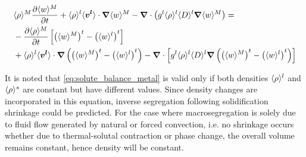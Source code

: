 %

\begin{align}
\label{eq:solute_balance_metal}
\begin{split}
 & \avg{\rho}^M \tempup{\avg{w}^M}  + \rhol  \vit \cdot \nabvec \avg{w}^M - \nabvec \cdot \brac{\gl \rhol \Dl \nabvec \avg{w}^M}=\\
 &	 - \tempup{\avg{\rho}^M} \crochet{\brac{\avg{w}^M}^t - \brac{\wl}^t} \\ 
 &	 + \rhol \vit \cdot \nabvec \brac{\brac{\avg{w}^M}^t -\brac{\wl}^t}
 	 - \nabvec \cdot \crochet{\gl \rhol \Dl  \nabvec \brac{\brac{\avg{w}^M}^t -\brac{\wl}^t} }
  \end{split}
  \end{align}

It is noted that \cref{eq:solute_balance_metal} is valid only if both densities $\langle \rho \rangle^l$ and $\langle \rho \rangle^s$
are constant but have different values. Since density changes are incorporated in this equation, 
inverse segregation following solidification shrinkage could be predicted.
For the case where macrosegregation is solely due to fluid flow generated by natural or forced convection, 
i.e. no shrinkage occurs whether due to thermal-solutal contraction or phase change, 
the overall volume remains constant, hence density will be constant.


